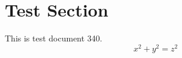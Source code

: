 \documentclass{article}
\begin{document}
\section{Test Section}
This is test document 340.
\begin{equation}
x^2 + y^2 = z^2
\end{equation}
\end{document}
